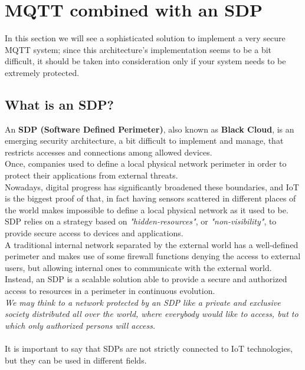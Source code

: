\documentclass[12pt]{report}
\begin{document}
{\section{MQTT combined with an SDP}
\bigskip
In this section we will see a sophisticated solution to implement a very secure MQTT system; since this architecture's implementation seems to be a bit difficult, it should be taken into consideration only if your system needs to be extremely protected.\\

\subsection{What is an SDP?}
\bigskip
An \textbf{SDP (Software Defined Perimeter)}, also known as \textbf{Black Cloud}, is an emerging security architecture, a bit difficult to implement and manage, that restricts accesses and connections among allowed devices.\\
Once, companies used to define a local physical network perimeter in order to protect their applications from external threats.\\
Nowadays, digital progress has significantly broadened these boundaries, and IoT is the biggest proof of that, in fact having sensors scattered in different places of the world makes impossible to define a local physical network as it used to be.\\

SDP relies on a strategy based on \textit{"hidden-resources"}, or \textit{"non-visibility"}, to provide secure access to devices and applications.\\
A traditional internal network separated by the external world has a well-defined perimeter and makes use of some firewall functions denying the access to external users, but allowing internal ones to communicate with the external world.\\
Instead, an SDP is a scalable solution able to provide a secure and authorized access to resources in a perimeter in continuous evolution.\\

\textit{We may think to a network protected by an SDP like a private and exclusive society distributed all over the world, where everybody would like to access, but to which only authorized persons will access.}\\\\
It is important to say that SDPs are not strictly connected to IoT technologies, but they can be used in different fields.\\

}
\end{document}
